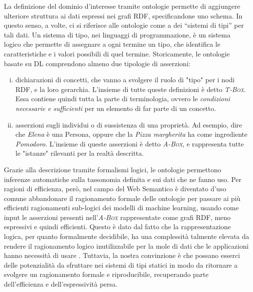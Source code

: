 La definizione del dominio d'interesse tramite ontologie permette di aggiungere ulteriore struttura ai dati espressi nei grafi RDF, specificandone uno schema. In questo senso, a volte, ci si riferisce alle ontologie come a dei “sistemi di tipi” per tali dati. Un sistema di tipo, nei linguaggi di programmazione, è un sistema logico che permette di assegnare a ogni termine un tipo, che identifica le caratteristiche e i valori possibili di quel termine. Storicamente, le ontologie basate su DL comprendono almeno due tipologie di asserzioni:
\begin{enumerate}[i)]
	\item dichiarazioni di concetti, che vanno a svolgere il ruolo di "tipo" per i nodi RDF, e la loro gerarchia. L'insieme di tutte queste definizioni è detto \textsc{\itshape T-Box}. Essa contiene quindi tutta la parte di terminologia, ovvero le \textit{condizioni necessarie e sufficienti} per un elemento di far parte di un concetto.
	\item asserzioni sugli individui o di sussistenza di una proprietà. Ad esempio, dire che \textsl{Elena} è una Persona, oppure che la \textsl{ Pizza margherita} ha come ingrediente \textsl{Pomodoro}. L'insieme di queste asserzioni è detto \textsc{\itshape A-Box}, e rappresenta tutte le "istanze" rilevanti per la realtà descritta.
\end{enumerate}
Grazie alla descrizione tramite formalismi logici, le ontologie permettono inferenze automatiche sulla tassonomia definita e sui dati che ne fanno uso. Per ragioni di efficienza, però, nel campo del Web Semantico è diventato d'uso comune abbandonare il ragionamento formale delle ontologie per passare ai più efficienti ragionamenti sub-logici dei modelli di machine learning, usando come input le asserzioni presenti nell'\textsc{\itshape A-Box} rappresentate come grafi RDF, meno espressivi e quindi efficienti. Questo è dato dal fatto che la rappresentazione logica, per quanto formalmente decidibile, ha una complessità talmente elevata da rendere il ragionamento logico inutilizzabile per la mole di dati che le applicazioni hanno necessità di usare \cite{baader2017introductionDL}. Tuttavia, la nostra convinzione è che possano esserci delle potenzialità da sfruttare nei sistemi di tipi statici in modo da ritornare a svolgere un ragionamento formale e riproducibile, recuperando parte dell'efficienza e dell'espressività persa.
\newpage
